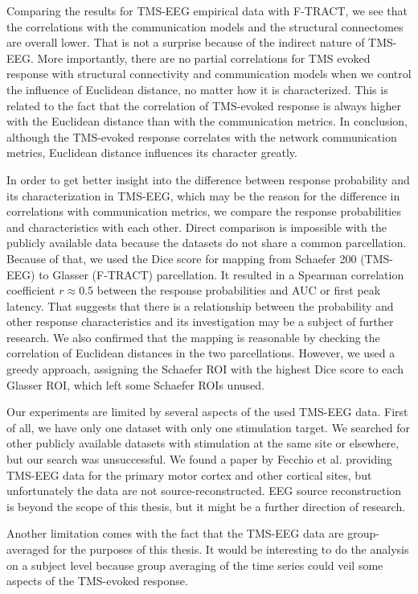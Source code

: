 Comparing the results for TMS-EEG empirical data with F-TRACT, we see that the correlations with the communication models and the structural connectomes are overall lower. That is not a surprise because of the indirect nature of TMS-EEG. More importantly, there are no partial correlations for TMS evoked response with structural connectivity and communication models when we control the influence of Euclidean distance, no matter how it is characterized. This is related to the fact that the correlation of TMS-evoked response is always higher with the Euclidean distance than with the communication metrics. In conclusion, although the TMS-evoked response correlates with the network communication metrics, Euclidean distance influences its character greatly.

In order to get better insight into the difference between response probability and its characterization in TMS-EEG, which may be the reason for the difference in correlations with communication metrics, we compare the response probabilities and characteristics with each other. Direct comparison is impossible with the publicly available data because the datasets do not share a common parcellation. Because of that, we used the Dice score for mapping from Schaefer 200 (TMS-EEG) to Glasser (F-TRACT) parcellation. It resulted in a Spearman correlation coefficient $r\approx0.5$ between the response probabilities and AUC or first peak latency. That suggests that there is a relationship between the probability and other response characteristics and its investigation may be a subject of further research. We also confirmed that the mapping is reasonable by checking the correlation of Euclidean distances in the two parcellations. However, we used a greedy approach, assigning the Schaefer ROI with the highest Dice score to each Glasser ROI, which left some Schaefer ROIs unused. 

Our experiments are limited by several aspects of the used TMS-EEG data. First of all, we have only one dataset with only one stimulation target. We searched for other publicly available datasets with stimulation at the same site or elsewhere, but our search was unsuccessful. We found a paper by Fecchio et al. \cite{fecchio_spectral_2017} providing TMS-EEG data for the primary motor cortex and other cortical sites, but unfortunately the data are not source-reconstructed. EEG source reconstruction is beyond the scope of this thesis, but it might be a further direction of research.

Another limitation comes with the fact that the TMS-EEG data are group-averaged for the purposes of this thesis. It would be interesting to do the analysis on a subject level because group averaging of the time series could veil some aspects of the TMS-evoked response.

